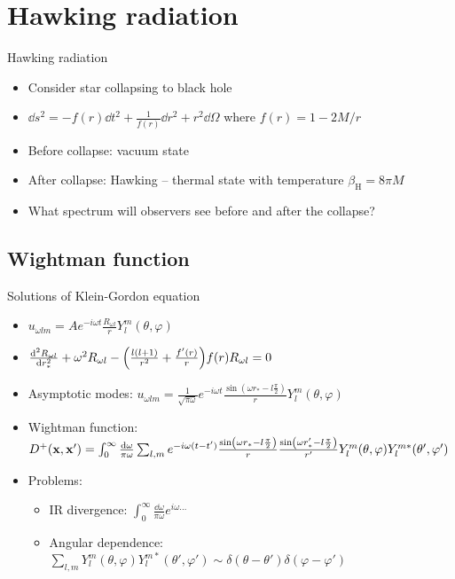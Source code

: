 \documentclass{beamer}
\let\todox\todo
\renewcommand\todo[1]{\todox[inline]{#1}}
\newcommand{\ind}[1]{_\mathrm{#1}}
\begin{document}
\section{Hawking radiation}
\begin{frame}{Hawking radiation}
\begin{itemize}
	\item Consider star collapsing to black hole
	\item \(\dd s^2 = -f(r)\dd{t^2} + \frac{1}{f(r)}\dd{r^2} + r^2 \dd{\Omega}\) where \(f(r) = 1 - 2M/r\)
	\item Before collapse:  vacuum state
	\item After collapse: Hawking \todo{cite} -- thermal state with temperature \(\beta\ind{H} = 8\pi M\)
	\item What spectrum will observers see before and after the collapse?
\end{itemize}
\end{frame}

\subsection{Wightman function}
\begin{frame}{Solutions of Klein-Gordon equation}
\begin{itemize}
	\item \(u_{\omega l m} = A e^{-i\omega t} \frac{R_{\omega l}}{r}Y_l^m (\theta, \varphi)\)
	\item \(\dv[2]{R_{\omega l}}{r_*} + \omega^2 R_{\omega l} -\qty(\frac{l(l+1)}{r^2} + \frac{f'(r)}{r})f(r) R_{\omega l} = 0\)
	\item Asymptotic modes: \(u_{\omega l m} = \frac{1}{\sqrt{\pi\omega}} e^{-i\omega t} \frac{\sin(\omega r_* - l\frac{\pi}{2})}{r} Y_l^m (\theta, \varphi)\) 
	\item Wightman function: \(D^+(\vb{x}, \vb{x}') = \int_0^\infty \frac{\dd{\omega}}{\pi\omega} \sum_{l,m} e^{-i\omega(t-t')} \frac{\sin(\omega r_* - l\frac{\pi}{2})}{r} \frac{\sin(\omega r_*' - l\frac{\pi}{2})}{r'} Y_l^m(\theta,\varphi) Y_l^{m*}(\theta',\varphi')\)
	\item Problems:
		\begin{itemize}
			\item IR divergence: \(\int_0^\infty \frac{\dd{\omega}}{\pi\omega} e^{i\omega\dots}\)
			\item Angular dependence: \(\sum_{l,m} Y_l^m(\theta,\varphi) Y_l^{m*}(\theta',\varphi') \sim \delta(\theta-\theta')\delta(\varphi-\varphi')\)
		\end{itemize}
\end{itemize}
\end{frame}
\end{document}
